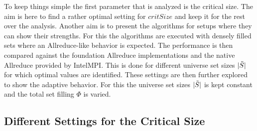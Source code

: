 To keep things simple the first parameter that is analyzed is the critical size. The aim is here to find a rather optimal setting for $critSize$ and keep it for the rest over the analysis. Another aim is to present the algorithms for setups where they can show their strengths. For this the algorithms are executed with densely filled sets where an Allreduce-like behavior is expected. The performance is then compared against the foundation Allreduce implementations and the native Allreduce provided by IntelMPI. This is done for different universe set sizes $|\Tilde{S}|$ for which optimal values are identified. These settings are then further explored to show the adaptive behavior. For this the universe set sizes $|\Tilde{S}|$ is kept constant and the total set filling $\Phi$ is varied.

\subsection{Different Settings for the Critical Size} \label{sec:PerformanceCriticalSize}
